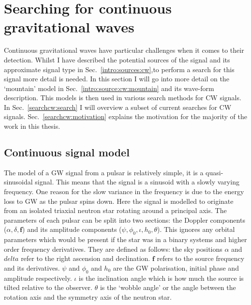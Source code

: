 \chapter{\label{searchcw}Searching for continuous gravitational waves}

Continuous gravitational waves have particular challenges when it comes to their detection.
Whilst I have described the potential sources of the signal and its approximate signal type in Sec.~\ref{intro:sources:cw},to perform a search for this signal more detail is needed.
In this section I will go into more detail on the `mountain' model in Sec.~\ref{intro:source:cw:mountain} and its wave-form description. 
This models is then used in various search methods for \ac{CW} signals.
In Sec.~\ref{searchcw:search} I will overview a subset of current searches for \ac{CW} signals.
Sec.~\ref{searchcw:motivation} explains the motivation for the majority of the work in this thesis.

\section{\label{searchcw:model}Continuous signal model}

The model of a \ac{GW} signal from a pulsar is relatively simple, it is a quasi-sinusoidal signal. This means that the signal is a sinusoid with a slowly varying frequency. One reason for the slow variance in the frequency is due to the energy loss to \ac{GW} as the pulsar spins down.
Here the signal is modelled to originate from an isolated triaxial neutron star rotating around a principal axis. 
The parameters of each pulsar can be split into two sections: the Doppler components ($\alpha,\delta,{\bm f}$) and its amplitude components ($\psi,\phi_0, \iota, h_0, \theta$). This ignores any orbital parameters which would be present if the star was in a binary systems and higher order frequency derivatives.
They are defined as follows: the sky positions $\alpha$ and $delta$ refer to the right ascension and declination. 
${\bm f}$ refers to the source frequency and its derivatives. 
$\psi$ and $\phi_0$ and $h_0 $ are the \ac{GW} polarisation, initial phase and amplitude respectively. 
$\iota$ is the inclination angle which is how much the source is tilted relative to the observer. 
$\theta$ is the `wobble angle' or the angle between the rotation axis and the symmetry axis of the neutron star.

